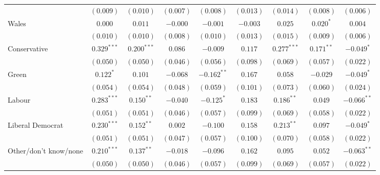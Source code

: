 \documentclass{article}
\begin{document}
\begin{table}
\begin{center}
{\begin{tabular}{l c c c c c c c c }
                                 & $(0.009)$      & $(0.010)$      & $(0.007)$      & $(0.008)$      & $(0.013)$      & $(0.014)$      & $(0.008)$      & $(0.006)$      \\
Wales                            & $0.000$        & $0.011$        & $-0.000$       & $-0.001$       & $-0.003$       & $0.025$        & $0.020^{*}$    & $0.004$        \\
                                 & $(0.010)$      & $(0.010)$      & $(0.008)$      & $(0.010)$      & $(0.013)$      & $(0.015)$      & $(0.009)$      & $(0.006)$      \\
Conservative                     & $0.329^{***}$  & $0.200^{***}$  & $0.086$        & $-0.009$       & $0.117$        & $0.277^{***}$  & $0.171^{**}$   & $-0.049^{*}$   \\
                                 & $(0.050)$      & $(0.050)$      & $(0.046)$      & $(0.056)$      & $(0.098)$      & $(0.069)$      & $(0.057)$      & $(0.022)$      \\
Green                            & $0.122^{*}$    & $0.101$        & $-0.068$       & $-0.162^{**}$  & $0.167$        & $0.058$        & $-0.029$       & $-0.049^{*}$   \\
                                 & $(0.054)$      & $(0.054)$      & $(0.048)$      & $(0.059)$      & $(0.101)$      & $(0.073)$      & $(0.060)$      & $(0.024)$      \\
Labour                           & $0.283^{***}$  & $0.150^{**}$   & $-0.040$       & $-0.125^{*}$   & $0.183$        & $0.186^{**}$   & $0.049$        & $-0.066^{**}$  \\
                                 & $(0.051)$      & $(0.051)$      & $(0.046)$      & $(0.057)$      & $(0.099)$      & $(0.069)$      & $(0.058)$      & $(0.022)$      \\
Liberal Democrat                 & $0.230^{***}$  & $0.152^{**}$   & $0.002$        & $-0.100$       & $0.158$        & $0.213^{**}$   & $0.097$        & $-0.049^{*}$   \\
                                 & $(0.051)$      & $(0.051)$      & $(0.047)$      & $(0.057)$      & $(0.100)$      & $(0.070)$      & $(0.058)$      & $(0.022)$      \\
Other/don't know/none            & $0.210^{***}$  & $0.137^{**}$   & $-0.018$       & $-0.096$       & $0.162$        & $0.095$        & $0.052$        & $-0.063^{**}$  \\
                                 & $(0.050)$      & $(0.050)$      & $(0.046)$      & $(0.057)$      & $(0.099)$      & $(0.069)$      & $(0.057)$      & $(0.022)$      \\

\end{tabular}}
\end{center}
\end{table}
\end{document}
